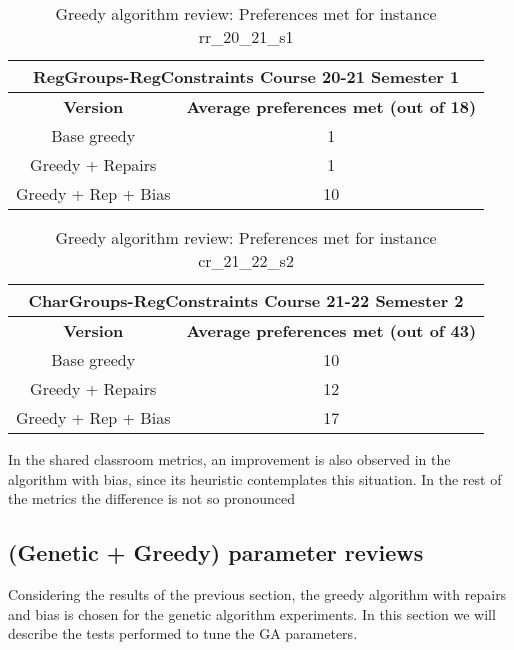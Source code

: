 \begin{table}[H]
    \centering
    \caption{Greedy algorithm review: Preferences met for instance rr\_20\_21\_s1}
    \label{table-prefs-01}
    \begin{tabular}{|c|c|}
        \hline
        \multicolumn{2}{|c|}{\textbf{RegGroups-RegConstraints Course 20-21 Semester 1}} \\
        \hline
        \textbf{Version} & \textbf{Average preferences met (out of 18)} \\
        \hline
        \rowcolor{blue!30}
        Base greedy & 1 \\
        \rowcolor{blue!10}
        Greedy + Repairs & 1 \\
        \rowcolor{blue!30}
        Greedy + Rep + Bias & 10 \\
        \hline
    \end{tabular}
\end{table}


\begin{table}[H]
    \centering
    \caption{Greedy algorithm review: Preferences met for instance cr\_21\_22\_s2}
    \label{table-prefs-02}
    \begin{tabular}{|c|c|}
        \hline
        \multicolumn{2}{|c|}{\textbf{CharGroups-RegConstraints Course 21-22 Semester 2}} \\
        \hline
        \textbf{Version} & \textbf{Average preferences met (out of 43)} \\
        \hline
        \rowcolor{blue!30}
        Base greedy & 10 \\
        \rowcolor{blue!10}
        Greedy + Repairs & 12 \\
        \rowcolor{blue!30}
        Greedy + Rep + Bias & 17 \\
        \hline
    \end{tabular}
\end{table}

In the shared classroom metrics, an improvement is also observed in the algorithm with bias, since its heuristic contemplates this situation. In the rest of the metrics the difference is not so pronounced


\subsection{(Genetic + Greedy) parameter reviews}

Considering the results of the previous section, the greedy algorithm with repairs and bias is chosen for the genetic algorithm experiments. In this section we will describe the tests performed to tune the GA parameters.


